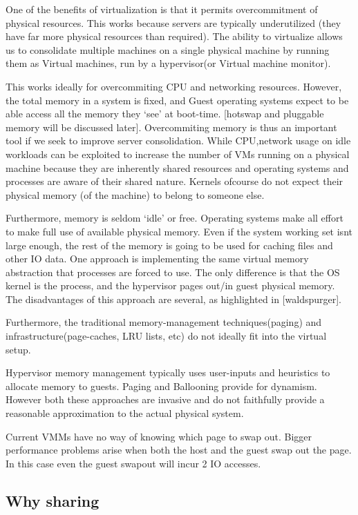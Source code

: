 \documentclass[11pt]{article}
\begin{document}
One of the benefits of virtualization is that it permits overcommitment of physical resources. This works because servers are typically underutilized (they have far more physical resources than required). The ability to virtualize allows us to consolidate multiple machines on a single physical machine by running them as Virtual machines, run by a hypervisor(or Virtual machine monitor).

This works ideally for overcommiting CPU and networking resources. However, the total memory in a system is fixed, and Guest operating systems expect to be able access all the memory they `see' at boot-time. [hotswap and pluggable memory will be discussed later].
Overcommiting memory is thus an important tool if we seek to improve server consolidation. 
While CPU,network usage on idle workloads can be exploited to increase the number of VMs running on a physical machine because they are inherently shared resources and operating systems and processes are aware of their shared nature. Kernels ofcourse do not expect their physical memory (of the machine) to belong to someone else. 

Furthermore, memory is seldom `idle' or free. Operating systems make all effort to make full use of available physical memory. Even if the system working set isnt large enough, the rest of the memory is going to be used for caching files and other IO data. 
One approach is implementing the same virtual memory abstraction that processes are forced to use. 
The only difference is that the OS kernel is the process, and the hypervisor pages out/in guest physical memory. The disadvantages of this approach are several, as highlighted in [waldspurger].

Furthermore, the traditional memory-management techniques(paging) and infrastructure(page-caches, LRU lists, etc) do not ideally fit into the virtual setup. 

Hypervisor memory management typically uses user-inputs and heuristics to allocate memory to guests. Paging and Ballooning provide for dynamism. However both these approaches are invasive and do not faithfully provide a reasonable approximation to the actual physical system.

Current VMMs have no way of knowing which page to swap out. Bigger performance problems arise when both the host and the guest swap out the page. In this case even the guest swapout will incur 2 IO accesses.
  
\subsection{Why sharing}
\label{sec-2_1}
\end{document}

